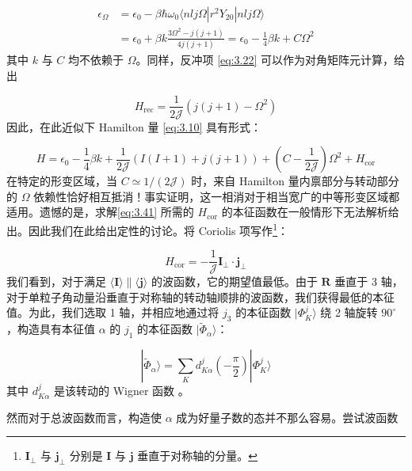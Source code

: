 \begin{align}
\epsilon_{\Omega} & =\epsilon_{0}-\beta\hbar\omega_{0}\langle nlj\Omega|r^{2}Y_{20}|nlj\Omega\rangle\nonumber \\
 & =\epsilon_{0}+\beta k\frac{3\Omega^{2}-j(j+1)}{4j(j+1)}=\epsilon_{0}-\frac{1}{4}\beta k+C\Omega^{2}\label{eq:3.39}
\end{align}
其中 $k$ 与 $C$ 均不依赖于 $\Omega$。同样，反冲项 \ref{eq:3.22} 可以作为对角矩阵元计算，给出

\begin{equation}
H_{\text{rec}}=\frac{1}{2\mathcal{J}}\left(j(j+1)-\Omega^{2}\right)\label{eq:3.40}
\end{equation}
因此，在此近似下 Hamilton 量 \ref{eq:3.10} 具有形式：

\begin{equation}
H=\epsilon_{0}-\frac{1}{4}\beta k+\frac{1}{2\mathcal{J}}\left(I(I+1)+j(j+1)\right)+\left(C-\frac{1}{2\mathcal{J}}\right)\Omega^{2}+H_{\text{cor}}\label{eq:3.41}
\end{equation}
在特定的形变区域，当 $C\simeq1/(2\mathcal{J})$ 时，来自 Hamilton 量内禀部分与转动部分的 $\Omega$
依赖性恰好相互抵消！事实证明，这一相消对于相当宽广的中等形变区域都适用。遗憾的是，求解\ref{eq:3.41} 所需的 $H_{\text{cor}}$
的本征函数在一般情形下无法解析给出。因此我们在此给出定性的讨论。将 Coriolis 项写作\footnote{$\boldsymbol{I}_{\perp}$ 与 $\boldsymbol{j}_{\perp}$ 分别是 $\boldsymbol{I}$
与 $\boldsymbol{j}$ 垂直于对称轴的分量。}：

\begin{equation}
H_{\text{cor}}=-\frac{1}{\mathcal{J}}\boldsymbol{I}_{\perp}\cdot\boldsymbol{j}_{\perp}\label{eq:3.42}
\end{equation}
我们看到，对于满足 $\langle\boldsymbol{I}\rangle\parallel\langle\boldsymbol{j}\rangle$
的波函数，它的期望值最低。由于 $\boldsymbol{R}$ 垂直于 3 轴，对于单粒子角动量沿垂直于对称轴的转动轴顺排的波函数，我们获得最低的本征值。为此，我们选取
1 轴，并相应地通过将 $j_{3}$ 的本征函数 $|\Phi^{j}_{K}\rangle$ 绕 2 轴旋转 $90^{\circ}$，构造具有本征值
$\alpha$ 的 $j_{1}$ 的本征函数 $|\tilde{\Phi}_{\alpha}\rangle$：

\begin{equation}
|\tilde{\Phi}_{\alpha}\rangle=\sum_{K}d^{j}_{K\alpha}\left(-\frac{\pi}{2}\right)|\Phi^{j}_{K}\rangle\label{eq:3.43}
\end{equation}
其中 $d^{j}_{K\alpha}$ 是该转动的 Wigner 函数 \cite{Ed57}。

然而对于总波函数而言，构造使 $\alpha$ 成为好量子数的态并不那么容易。尝试波函数

